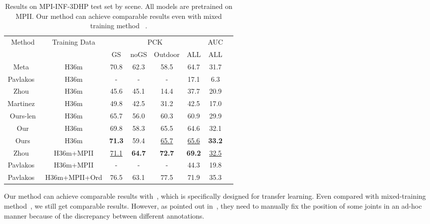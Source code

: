 \documentclass{bmvc2k}
\begin{document}
\begin{table}
\small
	\begin{center}
		\tabcolsep=0.11cm
		\begin{tabular}{|c|c|c|c|c|c|c|c|}
			\hline
			\multirow{2}{*}{Method} & \multirow{2}{*}{Training Data} & \multicolumn{4}{c|}{PCK}    & AUC      \\  \cline{3-7} 
			&   & GS   & noGS    & Outdoor   & ALL     & ALL       \\ \hline
			Meta~\cite{mono-3dhp2017}  & H36m & 70.8 & 62.3 & 58.5 & 64.7 & 31.7 \\
			Pavlakos~\cite{pavlakos2018ordinal} & H36m & - & - & - & 17.1 & 6.3 \\
			Zhou~\cite{zhou2017weakly} & H36m &45.6 & 45.1 & 14.4 & 37.7 & 20.9 \\
			Martinez~\cite{martinez2017simple} & H36m &49.8 & 42.5 & 31.2 & 42.5 & 17.0 \\
            Ours-len & H36m & 65.7 & 56.0 & 60.3 & 60.9 & 29.9 \\
            Our & H36m & 69.8 & 58.3 & 65.5 & 64.6 & 32.1  \\
			Ours  & H36m &\textbf{71.3} & 59.4 & \underline{65.7}  &\underline{65.6}  & \textbf{33.2} \\ \hline \hline
            Zhou~\cite{zhou2017weakly} & H36m+MPII & \underline{71.1}          & \textbf{64.7}          & \textbf{72.7}          & \textbf{69.2}          & \underline{32.5}         \\ 
            Pavlakos~\cite{pavlakos2018ordinal} & H36m+MPII & - & - & - & 44.3 & 19.8 \\ 
            Pavlakos~\cite{pavlakos2018ordinal} & H36m+MPII+Ord & 76.5 & 63.1 & 77.5 & 71.9 & 35.3 \\ \hline
            
		\end{tabular}
	\end{center}
	\caption{Results on MPI-INF-3DHP test set by scene. All models are pretrained on MPII. Our method can achieve comparable results even with mixed training method~\cite{zhou2017weakly} .}
	\label{table:mpi-inf-3dhp_h36m}
\end{table}


Our method can achieve comparable results with~\cite{mono-3dhp2017}, which is specifically designed for transfer learning. Even compared with mixed-training method~\cite{zhou2017weakly}, we still get comparable results. However, as pointed out in~\cite{zhou2017weakly}, they need to manually fix the position of some joints in an ad-hoc manner because of the discrepancy between different annotations.  
\end{document}
